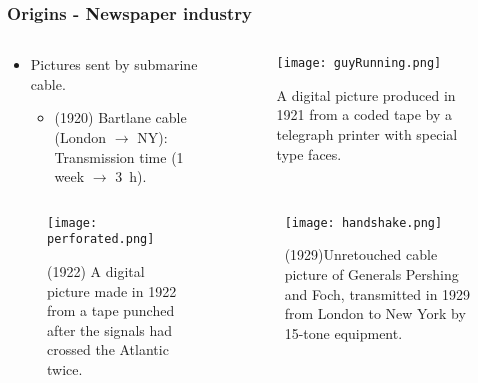 
\begin{frame}
\frametitle{Origins - Newspaper industry}
\begin{columns}
\begin{column}{.5\textwidth}
\begin{itemize}
\item Pictures sent by submarine cable.%
\begin{itemize}
\item (1920) Bartlane cable (London $\rightarrow$ NY): Transmission time (1 week $\rightarrow$ 3~h).
\end{itemize}
\end{itemize}
\end{column}
\begin{column}{.5\textwidth}
\begin{figure}
\texttt{[image: guyRunning.png]}
\caption{A digital picture produced in 1921 from a coded tape by a telegraph printer with special type faces.}
\end{figure}
\end{column}
\end{columns}
\end{frame}


\begin{frame}
\begin{columns}
\begin{column}{.48\textwidth}
\begin{figure}
\texttt{[image: perforated.png]}
\caption{(1922) A digital picture made in 1922 from a tape punched after the signals had crossed the Atlantic twice.}
\end{figure}
\end{column}
\begin{column}{.48\textwidth}
\begin{figure}
\texttt{[image: handshake.png]}
\caption{(1929)Unretouched cable picture of Generals Pershing and Foch, transmitted in 1929 from London to New York by 15-tone equipment.}
\end{figure}
\end{column}
\end{columns}
\end{frame}

